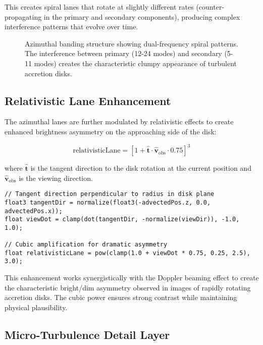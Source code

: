 \documentclass[12pt,a4paper]{article}
\theoremstyle{definition}
\theoremstyle{remark}
\begin{document}
This creates spiral lanes that rotate at slightly different rates (counter-propagating in the primary and secondary components), producing complex interference patterns that evolve over time.

\begin{figure}[H]
    \centering
    \caption{Azimuthal banding structure showing dual-frequency spiral patterns. The interference between primary (12-24 modes) and secondary (5-11 modes) creates the characteristic clumpy appearance of turbulent accretion disks.}
    \label{fig:azimuthal_banding}
\end{figure}

\subsection{Relativistic Lane Enhancement}

The azimuthal lanes are further modulated by relativistic effects to create enhanced brightness asymmetry on the approaching side of the disk:

\begin{equation}
    \text{relativisticLane} = \left[1 + \hat{\mathbf{t}} \cdot \hat{\mathbf{v}}_{\text{obs}} \cdot 0.75\right]^3
\end{equation}

where $\hat{\mathbf{t}}$ is the tangent direction to the disk rotation at the current position and $\hat{\mathbf{v}}_{\text{obs}}$ is the viewing direction.

\begin{lstlisting}[style=metalstyle, caption=Relativistic lane enhancement]
// Tangent direction perpendicular to radius in disk plane
float3 tangentDir = normalize(float3(-advectedPos.z, 0.0, advectedPos.x));
float viewDot = clamp(dot(tangentDir, -normalize(viewDir)), -1.0, 1.0);

// Cubic amplification for dramatic asymmetry
float relativisticLane = pow(clamp(1.0 + viewDot * 0.75, 0.25, 2.5), 3.0);
\end{lstlisting}

This enhancement works synergistically with the Doppler beaming effect to create the characteristic bright/dim asymmetry observed in images of rapidly rotating accretion disks. The cubic power ensures strong contrast while maintaining physical plausibility.

\subsection{Micro-Turbulence Detail Layer}
\end{document}
